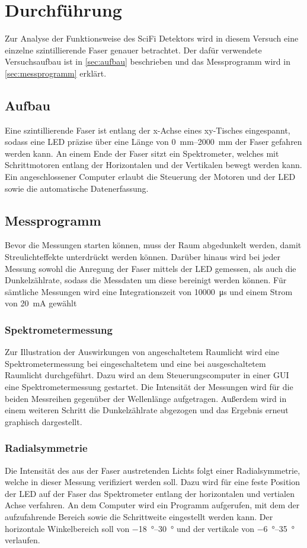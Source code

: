 \section{Durchführung}
\label{sec:Durchführung}
Zur Analyse der Funktionsweise des SciFi Detektors wird in diesem Versuch eine einzelne szintillierende Faser genauer betrachtet. Der dafür verwendete 
Versuchsaufbau ist in \autoref{sec:aufbau} beschrieben und das Messprogramm wird in \autoref{sec:messprogramm} erklärt.

\subsection{Aufbau}
\label{sec:aufbau}
Eine szintillierende Faser ist entlang der x-Achse eines xy-Tisches eingespannt, sodass eine LED präzise über eine Länge von \qtyrange{0}{2000}{\milli\metre}
der Faser gefahren werden kann. An einem Ende der Faser sitzt ein Spektrometer, welches mit Schrittmotoren entlang der Horizontalen und der Vertikalen bewegt
werden kann. Ein angeschlossener Computer erlaubt die Steuerung der Motoren und der LED sowie die automatische Datenerfassung.

\subsection{Messprogramm}
\label{sec:messprogramm}
Bevor die Messungen starten können, muss der Raum abgedunkelt werden, damit Streulichteffekte unterdrückt werden können. Darüber hinaus wird bei jeder Messung 
sowohl die Anregung der Faser mittels der LED gemessen, als auch die Dunkelzählrate, sodass die Messdaten um diese bereinigt werden können. Für sämtliche Messungen
wird eine Integrationszeit von \qty{10000}{\micro\second} und einem Strom von \qty{20}{\milli\ampere} gewählt

\subsubsection{Spektrometermessung}
Zur Illustration der Auswirkungen von angeschaltetem Raumlicht wird eine Spektrometermessung bei eingeschaltetem und eine bei ausgeschaltetem Raumlicht durchgeführt.
Dazu wird an dem Steuerungscomputer in einer GUI eine Spektrometermessung
gestartet. Die Intensität der Messungen wird für die beiden Messreihen gegenüber der Wellenlänge aufgetragen. Außerdem wird in einem weiteren Schritt die 
Dunkelzählrate abgezogen und das Ergebnis erneut graphisch dargestellt.

\subsubsection{Radialsymmetrie}
Die Intensität des aus der Faser austretenden Lichts folgt einer Radialsymmetrie, welche in dieser Messung verifiziert werden soll. Dazu wird für eine feste Position
der LED auf der Faser das Spektrometer entlang der horizontalen und vertialen Achse verfahren. An dem Computer wird ein Programm aufgerufen, mit dem der aufzufahrende 
Bereich sowie die Schrittweite eingestellt werden kann. Der horizontale Winkelbereich soll von \qtyrange{-18}{30}{\degree} und der vertikale von \qtyrange{-6}{35}{\degree}
verlaufen.

